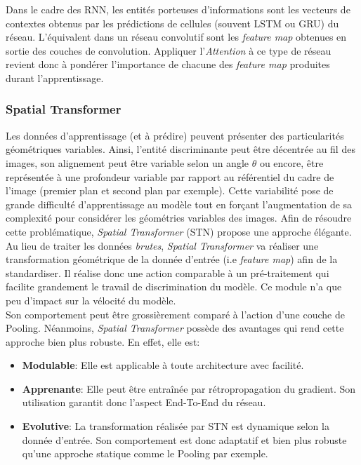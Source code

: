 \noindent Dans le cadre des RNN, les entités porteuses d'informations sont les vecteurs de contextes obtenus par les prédictions de cellules (souvent LSTM ou GRU) du réseau. L'équivalent dans un réseau convolutif sont les \textit{feature map} obtenues en sortie des couches de convolution. Appliquer l'\textit{Attention} à ce type de réseau revient donc à pondérer l'importance de chacune des \textit{feature map} produites durant l'apprentissage.

\subsubsection{Spatial Transformer}
Les données d'apprentissage (et à prédire) peuvent présenter des particularités géométriques variables. Ainsi, l'entité discriminante peut être décentrée au fil des images, son alignement peut être variable selon un angle $\theta$ ou encore, être représentée à une profondeur variable par rapport au référentiel du cadre de l'image (premier plan et second plan par exemple). Cette variabilité pose de grande difficulté d'apprentissage au modèle tout en forçant l'augmentation de sa complexité pour considérer les géométries variables des images. Afin de résoudre cette problématique, \textit{Spatial Transformer}\cite{standspa} (STN) propose une approche élégante.\\

\noindent Au lieu de traiter les données \textit{brutes}, \textit{Spatial Transformer} va réaliser une transformation géométrique de la donnée d'entrée (i.e \textit{feature map}) afin de la standardiser. Il réalise donc une action comparable à un pré-traitement qui facilite grandement le travail de discrimination du modèle. Ce module n'a que peu d'impact sur la vélocité du modèle.\\

\noindent Son comportement peut être grossièrement comparé à l'action d'une couche de Pooling. Néanmoins, \textit{Spatial Transformer} possède des avantages qui rend cette approche bien plus robuste. En effet, elle est:
\begin{itemize}
    \item \textbf{Modulable}: Elle est applicable à toute architecture avec facilité.
    \item \textbf{Apprenante}: Elle peut être entraînée par rétropropagation du gradient. Son utilisation garantit donc l'aspect End-To-End du réseau.
    \item \textbf{Evolutive}: La transformation réalisée par STN est dynamique selon la donnée d'entrée. Son comportement est donc adaptatif et bien plus robuste qu'une approche statique comme le Pooling par exemple.
\end{itemize}

